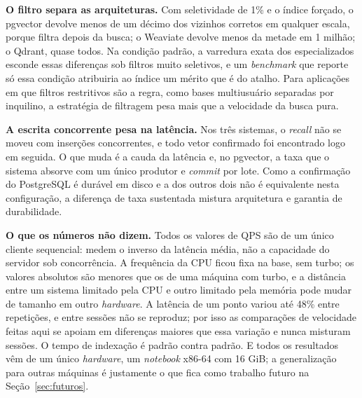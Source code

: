 \textbf{O filtro separa as arquiteturas.} Com seletividade de 1\% e o índice forçado, o pgvector devolve menos de um décimo dos vizinhos corretos em qualquer escala, porque filtra depois da busca; o Weaviate devolve menos da metade em 1 milhão; o Qdrant, quase todos. Na condição padrão, a varredura exata dos especializados esconde essas diferenças sob filtros muito seletivos, e um \textit{benchmark} que reporte só essa condição atribuiria ao índice um mérito que é do atalho. Para aplicações em que filtros restritivos são a regra, como bases multiusuário separadas por inquilino, a estratégia de filtragem pesa mais que a velocidade da busca pura.

\textbf{A escrita concorrente pesa na latência.} Nos três sistemas, o \textit{recall} não se moveu com inserções concorrentes, e todo vetor confirmado foi encontrado logo em seguida. O que muda é a cauda da latência e, no pgvector, a taxa que o sistema absorve com um único produtor e \textit{commit} por lote. Como a confirmação do PostgreSQL é durável em disco e a dos outros dois não é equivalente nesta configuração, a diferença de taxa sustentada mistura arquitetura e garantia de durabilidade.

\textbf{O que os números não dizem.} Todos os valores de QPS são de um único cliente sequencial: medem o inverso da latência média, não a capacidade do servidor sob concorrência. A frequência da CPU ficou fixa na base, sem turbo; os valores absolutos são menores que os de uma máquina com turbo, e a distância entre um sistema limitado pela CPU e outro limitado pela memória pode mudar de tamanho em outro \textit{hardware}. A latência de um ponto variou até 48\% entre repetições, e entre sessões não se reproduz; por isso as comparações de velocidade feitas aqui se apoiam em diferenças maiores que essa variação e nunca misturam sessões. O tempo de indexação é padrão contra padrão. E todos os resultados vêm de um único \textit{hardware}, um \textit{notebook} x86-64 com 16 GiB; a generalização para outras máquinas é justamente o que fica como trabalho futuro na Seção~\ref{sec:futuros}.
